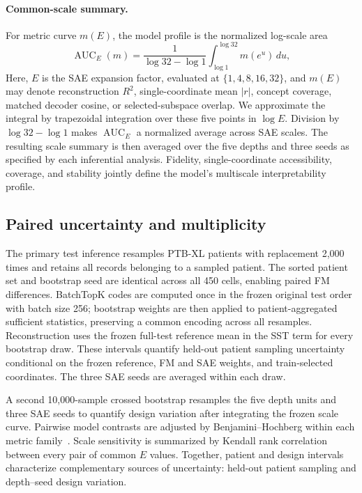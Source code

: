\paragraph{Common-scale summary.}
For metric curve $m(E)$, the model profile is the normalized log-scale area
\begin{equation}
  \operatorname{AUC}_{E}(m)=
  \frac{1}{\log 32-\log 1}\int_{\log 1}^{\log 32}m(e^u)\,du,
\end{equation}
Here, $E$ is the SAE expansion factor, evaluated at $\{1,4,8,16,32\}$, and $m(E)$ may denote reconstruction $R^2$, single-coordinate mean $|r|$, concept coverage, matched decoder cosine, or selected-subspace overlap. We approximate the integral by trapezoidal integration over these five points in $\log E$. Division by $\log 32-\log 1$ makes $\operatorname{AUC}_{E}$ a normalized average across SAE scales. The resulting scale summary is then averaged over the five depths and three seeds as specified by each inferential analysis. Fidelity, single-coordinate accessibility, coverage, and stability jointly define the model's multiscale interpretability profile.

\subsection{Paired uncertainty and multiplicity}

The primary test inference resamples PTB-XL patients with replacement 2,000 times and retains all records belonging to a sampled patient. The sorted patient set and bootstrap seed are identical across all 450 cells, enabling paired FM differences. BatchTopK codes are computed once in the frozen original test order with batch size 256; bootstrap weights are then applied to patient-aggregated sufficient statistics, preserving a common encoding across all resamples. Reconstruction uses the frozen full-test reference mean in the SST term for every bootstrap draw. These intervals quantify held-out patient sampling uncertainty conditional on the frozen reference, FM and SAE weights, and train-selected coordinates. The three SAE seeds are averaged within each draw.

A second 10,000-sample crossed bootstrap resamples the five depth units and three SAE seeds to quantify design variation after integrating the frozen scale curve. Pairwise model contrasts are adjusted by Benjamini--Hochberg within each metric family~\cite{benjamini1995fdr}. Scale sensitivity is summarized by Kendall rank correlation between every pair of common $E$ values. Together, patient and design intervals characterize complementary sources of uncertainty: held-out patient sampling and depth--seed design variation.

